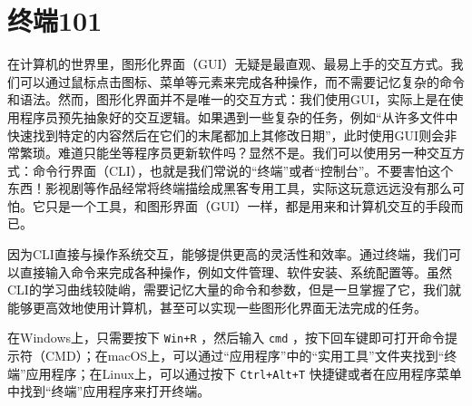 \chapter{终端101}\label{sec:terminal}

在计算机的世界里，图形化界面（GUI）无疑是最直观、最易上手的交互方式。我们可以通过鼠标点击图标、菜单等元素来完成各种操作，而不需要记忆复杂的命令和语法。然而，图形化界面并不是唯一的交互方式：我们使用GUI，实际上是在使用程序员预先抽象好的交互逻辑。如果遇到一些复杂的任务，例如“从许多文件中快速找到特定的内容然后在它们的末尾都加上其修改日期”，此时使用GUI则会非常繁琐。难道只能坐等程序员更新软件吗？显然不是。我们可以使用另一种交互方式：命令行界面（CLI），也就是我们常说的“终端”或者“控制台”。不要害怕这个东西！影视剧等作品经常将终端描绘成黑客专用工具，实际这玩意远远没有那么可怕。它只是一个工具，和图形界面（GUI）一样，都是用来和计算机交互的手段而已。

因为CLI直接与操作系统交互，能够提供更高的灵活性和效率。通过终端，我们可以直接输入命令来完成各种操作，例如文件管理、软件安装、系统配置等。虽然CLI的学习曲线较陡峭，需要记忆大量的命令和参数，但是一旦掌握了它，我们就能够更高效地使用计算机，甚至可以实现一些图形化界面无法完成的任务。

在Windows上，只需要按下 \texttt{Win+R} ，然后输入 \texttt{cmd} ，按下回车键即可打开命令提示符（CMD）；在macOS上，可以通过“应用程序”中的“实用工具”文件夹找到“终端”应用程序；在Linux上，可以通过按下 \texttt{Ctrl+Alt+T} 快捷键或者在应用程序菜单中找到“终端”应用程序来打开终端。


